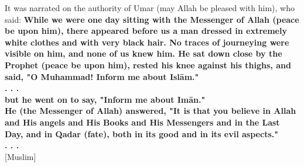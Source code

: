 It was narrated on the authority of Umar (may Allah be pleased with him), who said:
\textbf{While we were one day sitting with the Messenger of Allah (peace be upon him), there appeared before us a man dressed in extremely white clothes and with very black hair. No traces of journeying were visible on him, and none of us knew him. He sat down close by the Prophet (peace be upon him), rested his knee against his thighs, and said, "O Muhammad! Inform me about Isl\=am."\\
. . .\\
but he went on to say, "Inform me about Im\=an."\\
He (the Messenger of Allah) answered, "It is that you believe in Allah and His angels and His Books and His Messengers and in the Last Day, and in Qadar (fate), both in its good and in its evil aspects."\\
. . .\\
}
[Muslim]

